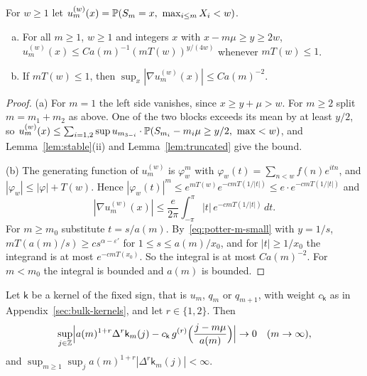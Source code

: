\begin{lemma}\label{lem:trunc-local}
For $w\ge1$ let $u^{(w)}_m(x)=\mathbb{P}(S_m=x,\ \max_{i\le m}X_i<w)$.
\begin{enumerate}[(a)]
\item For all $m\ge1$, $w\ge1$ and integers $x$ with $x-m\mu\ge y\ge2w$,
$u^{(w)}_m(x)\le Ca(m)^{-1}(mT(w))^{y/(4w)}$ whenever $mT(w)\le1$.
\item If $mT(w)\le1$, then $\sup_x|\nabla u^{(w)}_m(x)|\le Ca(m)^{-2}$.
\end{enumerate}
\end{lemma}

\begin{proof}
(a) For $m=1$ the left side vanishes, since $x\ge y+\mu>w$. For $m\ge2$ split $m=m_1+m_2$ as
above. One of the two blocks exceeds its mean by at least $y/2$, so
$u^{(w)}_m(x)\le\sum_{i=1,2}\sup u_{m_{3-i}}\cdot\mathbb{P}(S_{m_i}-m_i\mu\ge y/2,\ \max<w)$, and
Lemma~\ref{lem:stable}(ii) and Lemma~\ref{lem:truncated} give the bound.

(b) The generating function of $u^{(w)}_m$ is $\varphi_w^m$ with
$\varphi_w(t)=\sum_{n<w}f(n)e^{itn}$, and $|\varphi_w|\le|\varphi|+T(w)$. Hence
$|\varphi_w(t)|^m\le e^{mT(w)}e^{-cmT(1/|t|)}\le e\cdot e^{-cmT(1/|t|)}$ and
\[
 |\nabla u^{(w)}_m(x)|\le\frac e{2\pi}\int_{-\pi}^\pi|t|\,e^{-cmT(1/|t|)}\,dt .
\]
For $m\ge m_0$ substitute $t=s/a(m)$. By~\eqref{eq:potter-m-small} with $y=1/s$,
$mT(a(m)/s)\ge cs^{\alpha-\varepsilon'}$ for $1\le s\le a(m)/x_0$, and for $|t|\ge1/x_0$ the integrand is at most $e^{-cmT(x_0)}$. So the
integral is at most $Ca(m)^{-2}$. For $m<m_0$ the integral is bounded and $a(m)$ is bounded.
\end{proof}

\begin{lemma}\label{lem:fourier-diff}
Let $\mathsf k$ be a kernel of the fixed sign, that is $u_m$, $q_m$ or $q_{m+1}$, with weight
$c_{\mathsf k}$ as in Appendix~\ref{sec:bulk-kernels}, and let $r\in\{1,2\}$. Then
\[
 \sup_{j\in\mathbb{Z}}\Bigl|a(m)^{1+r}\Delta^r\mathsf k_m(j)-c_{\mathsf k}\,g^{(r)}\Bigl(\frac{j-m\mu}{a(m)}\Bigr)\Bigr|\to0
 \quad(m\to\infty),
\]
and $\sup_{m\ge1}\sup_ja(m)^{1+r}|\Delta^r\mathsf k_m(j)|<\infty$.
\end{lemma}

